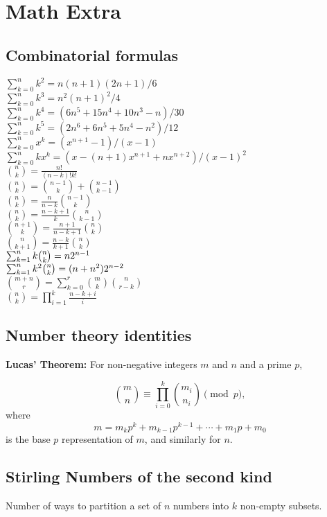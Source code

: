 \section{Math Extra}
\subsection{Combinatorial formulas}

 $\sum_{k=0}^{n}k^{2}=n(n+1)(2n+1)/6$\\
 $\sum_{k=0}^{n}k^{3}=n^{2}(n+1)^{2}/4$\\
 $\sum_{k=0}^{n}k^{4}=(6n^{5}+15n^{4}+10n^{3}-n)/30$\\
 $\sum_{k=0}^{n}k^{5}=(2n^{6}+6n^{5}+5n^{4}-n^{2})/12$\\
 $\sum_{k=0}^{n}x^{k}=(x^{n+1}-1)/(x-1)$\\
 $\sum_{k=0}^{n}kx^{k}=(x-(n+1)x^{n+1}+nx^{n+2})/(x-1)^{2}$\\
 ${n \choose k}=\frac{n!}{(n-k)!k!}$\\
 ${n \choose k}={n-1 \choose k}+{n-1 \choose k-1}$\\
 ${n \choose k}=\frac{n}{n-k}{n-1 \choose k}$\\
 ${n \choose k}=\frac{n-k+1}{k}{n \choose k-1}$\\
 ${n+1 \choose k}=\frac{n+1}{n-k+1}{n \choose k}$\\
 ${n \choose k+1}=\frac{n-k}{k+1}{n \choose k}$\\
 $\sum_{k=1}^{n}k\tbinom{n}{k}=n2^{n-1}$\\
 $\sum_{k=1}^{n}k^{2}\tbinom{n}{k}=(n+n^{2})2^{n-2}$\\
 ${m+n \choose r}=\sum_{k=0}^{r}{m \choose k}{n \choose r-k}$\\
 ${n \choose k}=\prod_{i=1}^{k}\frac{n-k+i}{i}$\\

\subsection{Number theory identities}
\textbf{Lucas' Theorem:} For non-negative integers $m$ and $n$ and a prime $p$,

$$\binom{m}{n}\equiv\prod_{i=0}^k\binom{m_i}{n_i}\pmod p,$$
where
$$m=m_kp^k+m_{k-1}p^{k-1}+\cdots +m_1p+m_0$$
is the base $p$ representation of $m$, and similarly for $n$.

\subsection{Stirling Numbers of the second kind}
Number of ways to partition a set of $n$ numbers into $k$ non-empty subsets.

